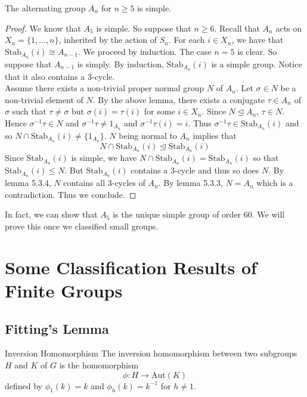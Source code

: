 \documentclass[a4paper]{article}
\begin{document}
\begin{thm}{}{} The alternating group $A_n$ for $n\geq 5$ is simple. 
\begin{proof}
We know that $A_5$ is simple. So suppose that $n\geq 6$. Recall that $A_n$ acts on $X_n=\{1,\dots,n\}$, inherited by the action of $S_n$. For each $i\in X_n$, we have that $\text{Stab}_{A_n}(i)\cong A_{n-1}$. We proceed by induction. The case $n=5$ is clear. So suppose that $A_{n-1}$ is simply. By induction, $\text{Stab}_{A_n}(i)$ is a simple group. Notice that it also contains a $3$-cycle. \\

Assume there exists a non-trivial proper normal group $N$ of $A_n$. Let $\sigma\in N$ be a non-trivial element of $N$. By the above lemma, there exists a conjugate $\tau\in A_n$ of $\sigma$ such that $\tau\neq\sigma$ but $\sigma(i)=\tau(i)$ for some $i\in X_n$. Since $N\trianglelefteq A_n$, $\tau\in N$. Hence $\sigma^{-1}\tau\in N$ and $\sigma^{-1}\tau\neq 1_{A_n}$ and $\sigma^{-1}\tau(i)=i$. Thus $\sigma^{-1}\tau\in\text{Stab}_{A_n}(i)$ and so $N\cap\text{Stab}_{A_n}(i)\neq\{1_{A_n}\}$. $N$ being normal to $A_n$ implies that $$N\cap\text{Stab}_{A_n}(i)\trianglelefteq\text{Stab}_{A_n}(i)$$ Since $\text{Stab}_{A_n}(i)$ is simple, we have $N\cap\text{Stab}_{A_n}(i)=\text{Stab}_{A_n}(i)$ so that $\text{Stab}_{A_n}(i)\leq N$. But $\text{Stab}_{A_n}(i)$ contains a $3$-cycle and thus so does $N$. By lemma 5.3.4, $N$ contains all $3$-cycles of $A_n$. By lemma 5.3.3, $N=A_n$ which is a contradiction. Thus we conclude. 
\end{proof}
\end{thm}

In fact, we can show that $A_5$ is the unique simple group of order $60$. We will prove this once we classified small groups. 

\pagebreak
\section{Some Classification Results of Finite Groups}
\subsection{Fitting's Lemma}
\begin{defn}{Inversion Homomorphism}{} The inversion homomorphism between two subgroups $H$ and $K$ of $G$ is the homomorphism $$\phi:H\to\text{Aut}(K)$$ defined by $\phi_1(k)=k$ and $\phi_h(k)=k^{-1}$ for $h\neq 1$. 
\end{defn}
\end{document}
